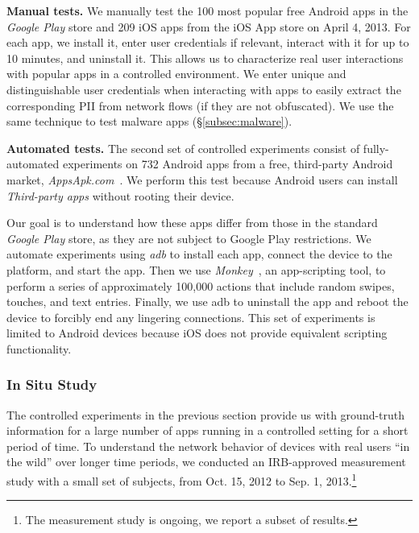\noindent\textbf{Manual tests.} We manually test the
100 most popular free Android apps in the \emph{Google Play} store and 209
iOS apps from the iOS App store on April 4, 2013. For each
app, we install it, enter user credentials %
if relevant, interact with it for up to 10 minutes, and uninstall
it. This allows us to characterize real user interactions with popular apps
in a controlled environment.  
We enter unique and distinguishable user credentials when 
interacting with apps to easily extract the corresponding PII from 
network flows (if they are not obfuscated). We use the same technique 
to test malware apps (\S\ref{subsec:malware}).

\noindent\textbf{Automated tests.} The second set of controlled experiments consist of fully-automated
experiments on 732 Android apps from a free,
third-party Android market, \emph{AppsApk.com}~\cite{appsapk}.
We perform this test because Android users can install
\emph{Third-party apps} without rooting their device. 

Our goal is to understand how these apps differ from those in the standard \emph{Google Play} 
store, as they are not subject to Google Play restrictions.
We automate experiments using \emph{adb} to
install each app, connect the device to the \meddle platform, and
start the app. Then we use \emph{Monkey}~\cite{adbmonkey}, an app-scripting 
tool, to perform a series of  approximately 100,000 actions that include
random swipes, touches, and text entries.  Finally, we use adb to
uninstall the app and reboot the device to forcibly end any
lingering connections. This set of experiments is limited to
Android devices because iOS does not provide equivalent 
scripting functionality. 

\subsubsection{In Situ Study}
\label{sec:dataset-wild-measurements}

The controlled experiments in the previous section provide us with 
ground-truth information for a large number of apps running in a controlled 
setting for a short period of time. To understand the network behavior of 
devices with real users ``in the wild'' over longer time periods, we conducted 
an IRB-approved measurement study with a small set of subjects, from 
Oct. 15, 2012 to Sep. 1, 2013.\footnote{The measurement study is ongoing, we report a subset of results.}

